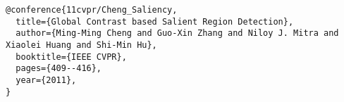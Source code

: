 \documentclass[a4paper,14pt]{article}
\begin{document}
\vspace{.2in}

{\footnotesize %
\begin{verbatim}
@conference{11cvpr/Cheng_Saliency,
  title={Global Contrast based Salient Region Detection},
  author={Ming-Ming Cheng and Guo-Xin Zhang and Niloy J. Mitra and Xiaolei Huang and Shi-Min Hu},
  booktitle={IEEE CVPR},
  pages={409--416},
  year={2011},
}
\end{verbatim}
}
\end{document}
